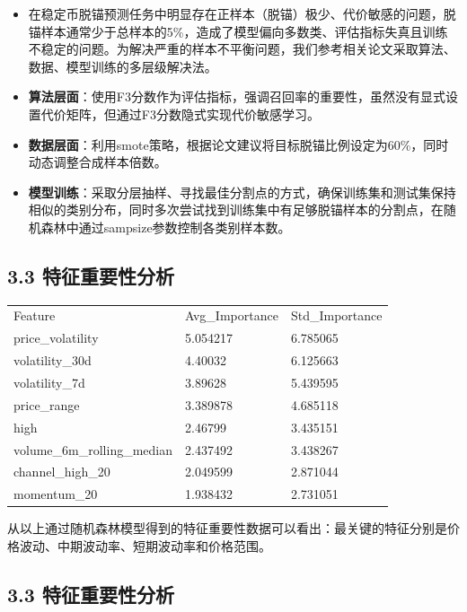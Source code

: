 \documentclass[
  letterpaper,
  DIV=11,
  numbers=noendperiod]{scrartcl}
\providecommand{\tightlist}{%
  \setlength{\itemsep}{0pt}\setlength{\parskip}{0pt}}
\begin{document}
\begin{itemize}
\tightlist
\item
  在稳定币脱锚预测任务中明显存在正样本（脱锚）极少、代价敏感的问题，脱锚样本通常少于总样本的5\%，造成了模型偏向多数类、评估指标失真且训练不稳定的问题。为解决严重的样本不平衡问题，我们参考相关论文采取算法、数据、模型训练的多层级解决法。
\item
  \textbf{算法层面}：使用F3分数作为评估指标，强调召回率的重要性，虽然没有显式设置代价矩阵，但通过F3分数隐式实现代价敏感学习。
\item
  \textbf{数据层面}：利用smote策略，根据论文建议将目标脱锚比例设定为60\%，同时动态调整合成样本倍数。
\item
  \textbf{模型训练}：采取分层抽样、寻找最佳分割点的方式，确保训练集和测试集保持相似的类别分布，同时多次尝试找到训练集中有足够脱锚样本的分割点，在随机森林中通过sampsize参数控制各类别样本数。
\end{itemize}

\subsection{3.3
特征重要性分析}\label{ux7279ux5f81ux91cdux8981ux6027ux5206ux6790}

\begin{longtable}[]{@{}lll@{}}
\toprule\noalign{}
\endhead
\bottomrule\noalign{}
\endlastfoot
Feature & Avg\_Importance & Std\_Importance \\
price\_volatility & 5.054217 & 6.785065 \\
volatility\_30d & 4.40032 & 6.125663 \\
volatility\_7d & 3.89628 & 5.439595 \\
price\_range & 3.389878 & 4.685118 \\
high & 2.46799 & 3.435151 \\
volume\_6m\_rolling\_median & 2.437492 & 3.438267 \\
channel\_high\_20 & 2.049599 & 2.871044 \\
momentum\_20 & 1.938432 & 2.731051 \\
\end{longtable}

从以上通过随机森林模型得到的特征重要性数据可以看出：最关键的特征分别是价格波动、中期波动率、短期波动率和价格范围。

\subsection{3.3
特征重要性分析}\label{ux7279ux5f81ux91cdux8981ux6027ux5206ux6790-1}
\end{document}
